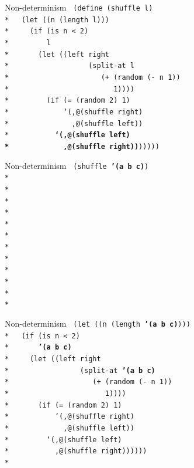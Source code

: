 \documentclass{beamer}
\begin{document}
\begin{frame}{Non-determinism}
  \texttt{
    (define (shuffle l)\\*
    \ \ (let ((n (length l)))\\*
    \ \ \ \ (if (is n < 2)\\*
    \ \ \ \ \ \ \ \ l\\*
    \ \ \ \ \ \ (let ((left right\\*
    \ \ \ \ \ \ \ \ \ \ \ \ \ \ \ \ \ \ (split-at l\\*
    \ \ \ \ \ \ \ \ \ \ \ \ \ \ \ \ \ \ \ \ \ (+ (random (- n 1))\\*
    \ \ \ \ \ \ \ \ \ \ \ \ \ \ \ \ \ \ \ \ \ \ \ \ 1))))\\*
    \ \ \ \ \ \ \ \ (if (= (random 2) 1)\\*
    \ \ \ \ \ \ \ \ \ \ \ \ `(,@(shuffle right)\\*
    \ \ \ \ \ \ \ \ \ \ \ \ \ \ ,@(shuffle left))\\*
    \ \ \ \ \ \ \ \ \ \ \textbf{`(,@(shuffle left)\\*
    \ \ \ \ \ \ \ \ \ \ \ \ ,@(shuffle right))})))))
    }
\end{frame}

\begin{frame}{Non-determinism}
  \texttt{
    (shuffle \textbf{'(a b c)})\\*
    \ \\*
    \ \\*
    \ \\*
    \ \\*
    \ \\*
    \ \\*
    \ \\*
    \ \\*
    \ \\*
    \ \\*
    \ \\*
    \ 
    }
\end{frame}

\begin{frame}{Non-determinism}
  \texttt{
    (let ((n (length \textbf{'(a b c)})))\\*
    \ \ (if (is n < 2)\\*
    \ \ \ \ \ \ \textbf{'(a b c)}\\*
    \ \ \ \ (let ((left right\\*
    \ \ \ \ \ \ \ \ \ \ \ \ \ \ \ \ (split-at \textbf{'(a b c)}\\*
    \ \ \ \ \ \ \ \ \ \ \ \ \ \ \ \ \ \ \ (+ (random (- n 1))\\*
    \ \ \ \ \ \ \ \ \ \ \ \ \ \ \ \ \ \ \ \ \ \ 1))))\\*
    \ \ \ \ \ \ (if (= (random 2) 1)\\*
    \ \ \ \ \ \ \ \ \ \ `(,@(shuffle right)\\*
    \ \ \ \ \ \ \ \ \ \ \ \ ,@(shuffle left))\\*
    \ \ \ \ \ \ \ \ `(,@(shuffle left)\\*
    \ \ \ \ \ \ \ \ \ \ ,@(shuffle right))))))\\*
    \ 
    }
\end{frame}
\end{document}
